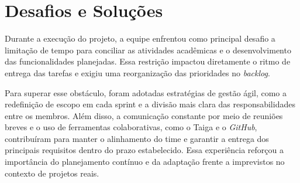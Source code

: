 \section{Desafios e Soluções}

Durante a execução do projeto, a equipe enfrentou como principal desafio a limitação de tempo para conciliar as atividades acadêmicas e o desenvolvimento das funcionalidades planejadas. Essa restrição impactou diretamente o ritmo de entrega das tarefas e exigiu uma reorganização das prioridades no \emph{backlog}. 

Para superar esse obstáculo, foram adotadas estratégias de gestão ágil, como a redefinição de escopo em cada sprint e a divisão mais clara das responsabilidades entre os membros. Além disso, a comunicação constante por meio de reuniões breves e o uso de ferramentas colaborativas, como o Taiga e o \emph{GitHub}, contribuíram para manter o alinhamento do time e garantir a entrega dos principais requisitos dentro do prazo estabelecido. Essa experiência reforçou a importância do planejamento contínuo e da adaptação frente a imprevistos no contexto de projetos reais.
